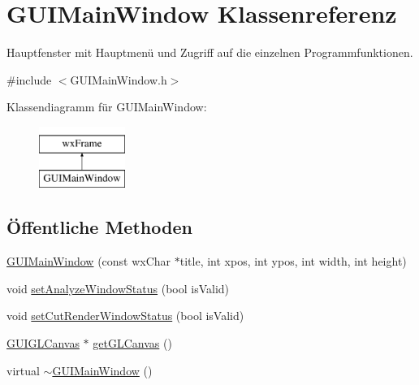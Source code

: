 \hypertarget{classGUIMainWindow}{\section{G\-U\-I\-Main\-Window Klassenreferenz}
\label{classGUIMainWindow}
}


Hauptfenster mit Hauptmenü und Zugriff auf die einzelnen Programmfunktionen.  




{\ttfamily \#include $<$G\-U\-I\-Main\-Window.\-h$>$}

Klassendiagramm für G\-U\-I\-Main\-Window\-:\begin{figure}[H]
\begin{center}
\leavevmode
\includegraphics[height=2.000000cm]{classGUIMainWindow}
\end{center}
\end{figure}
\subsection*{Öffentliche Methoden}
\begin{DoxyCompactItemize}
\item 
\hyperlink{classGUIMainWindow_a55cb97ffda12d79c6d6d50c9de35a3fe}{G\-U\-I\-Main\-Window} (const wx\-Char $\ast$title, int xpos, int ypos, int width, int height)
\item 
void \hyperlink{classGUIMainWindow_a64f6c71f9d92ab4091670ad1d264b2d7}{set\-Analyze\-Window\-Status} (bool is\-Valid)
\item 
void \hyperlink{classGUIMainWindow_a4b8b9293b800ca5ff47d1cb3a75f06a5}{set\-Cut\-Render\-Window\-Status} (bool is\-Valid)
\item 
\hyperlink{classGUIGLCanvas}{G\-U\-I\-G\-L\-Canvas} $\ast$ \hyperlink{classGUIMainWindow_a52e68b866f7835c3691fd8fad8ba910d}{get\-G\-L\-Canvas} ()
\item 
virtual \hyperlink{classGUIMainWindow_a16ca27363f15a5f2678417bbf26880d2}{$\sim$\-G\-U\-I\-Main\-Window} ()
\end{DoxyCompactItemize}
